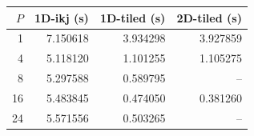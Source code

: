 \begin{center}
\small
\begin{tabular}{rrrr}
\toprule
$P$ & 1D-ikj (s) & 1D-tiled (s) & 2D-tiled (s) \\
\midrule
1 & 7.150618 & 3.934298 & 3.927859 \\
4 & 5.118120 & 1.101255 & 1.105275 \\
8 & 5.297588 & 0.589795 & -- \\
16 & 5.483845 & 0.474050 & 0.381260 \\
24 & 5.571556 & 0.503265 & -- \\
\bottomrule
\end{tabular}
\end{center}
